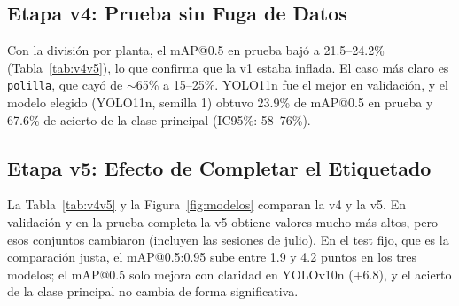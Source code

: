 \documentclass[sensors,article,submit,pdftex,moreauthors]{Definitions/mdpi}
\begin{document}
\subsection{Etapa v4: Prueba sin Fuga de Datos}

Con la división por planta, el mAP@0.5 en prueba bajó a 21.5--24.2\% (Tabla~\ref{tab:v4v5}), lo que confirma que la v1 estaba inflada. El caso más claro es \texttt{polilla}, que cayó de $\sim$65\% a 15--25\%. YOLO11n fue el mejor en validación, y el modelo elegido (YOLO11n, semilla 1) obtuvo 23.9\% de mAP@0.5 en prueba y 67.6\% de acierto de la clase principal (IC95\%: 58--76\%).

\subsection{Etapa v5: Efecto de Completar el Etiquetado}\label{sec:v5}

La Tabla~\ref{tab:v4v5} y la Figura~\ref{fig:modelos} comparan la v4 y la v5. En validación y en la prueba completa la v5 obtiene valores mucho más altos, pero esos conjuntos cambiaron (incluyen las sesiones de julio). En el test fijo, que es la comparación justa, el mAP@0.5:0.95 sube entre 1.9 y 4.2 puntos en los tres modelos; el mAP@0.5 solo mejora con claridad en YOLOv10n (+6.8), y el acierto de la clase principal no cambia de forma significativa.
\end{document}

